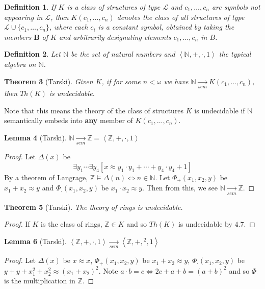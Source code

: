 \documentclass[12pt,a4paper]{article}
\newtheorem{theorem}{Theorem}[section]
\newtheorem{lemma}[theorem]{Lemma}
\newtheorem{definition}[theorem]{Definition}
\newcommand\NN{\mathbb{N}}
\newcommand\ZZ{\mathbb{Z}}
\newcommand\BBB{\mathbf{B}}
\newcommand\LL{\mathcal{L}}
\begin{document}
\begin{definition}
    If $K$ is a class of structures of type $\LL$ and $c_1,\ldots,c_n$ are symbols not appearing in $\LL$, then $K(c_1,\ldots,c_n)$ denotes the class of all structures of type $\LL\cup\{c_1,\ldots,c_n\}$, where each $c_i$ is a constant symbol, obtained by taking the members $\BBB$ of $K$ and arbitrarily designating elements $c_1,\ldots,c_n$ in $B$.
\end{definition}

\begin{definition}
    Let $\NN$ be the set of natural numbers and $\left<\NN,+,\cdot,1\right>$ the typical algebra on $\NN$.
\end{definition}

\begin{theorem}[Tarski]
    Given $K$, if for some $n<\omega$ we have $\NN\xrightarrow[sem]{}K(c_1,\ldots,c_n)$, then $Th(K)$ is undecidable.
\end{theorem}

Note that this means the theory of the class of structures $K$ is undecidable if $\NN$ semantically embeds into \textbf{any} member of $K(c_1,\ldots,c_n)$.

\begin{lemma}[Tarski]
    $\NN\xrightarrow[sem]{}\ZZ=\left<\ZZ,+,\cdot,1\right>$
\end{lemma}
\begin{proof}
    Let $\Delta(x)$ be
    \[
        \exists y_1\cdots\exists y_4[x\approx y_1\cdot y_1+\cdots+y_4 \cdot y_4 +1]
    \]
    By a theorem of Langrage, $\ZZ\models\Delta(n)\iff n\in\NN$.
    Let $\Phi_+(x_1,x_2,y)$ be $x_1+x_2\approx y$ and $\Phi_\cdot(x_1,x_2,y)$ be $x_1\cdot x_2\approx y$.
    Then from this, we see $\NN\xrightarrow[sem]{}\ZZ$.
\end{proof}

\begin{theorem}[Tarski]
    The theory of rings is undecidable.
\end{theorem}
\begin{proof}
    If $K$ is the class of rings, $\ZZ\in K$ and so $Th(K)$ is undecidable by $4.7$.
\end{proof}

\begin{lemma}[Tarski]
    $\left<\ZZ,+,\cdot,1\right>\xrightarrow[sem]{}\left<\ZZ,+,{}^2,1\right>$
\end{lemma}
\begin{proof}
    Let $\Delta(x)$ be $x\approx x$, $\Phi_+(x_1,x_2,y)$ be $x_1+x_2\approx y$, $\Phi_\cdot(x_1,x_2,y)$ be $y+y+x_1^2+x_2^2\approx(x_1+x_2)^2$.
    Note $a\cdot b=c\iff 2c+a+b=(a+b)^2$ and so $\Phi_\cdot$ is the multiplication in $\ZZ$.
\end{proof}
\end{document}
